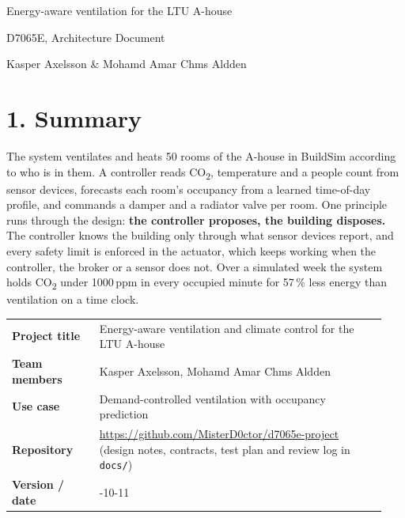 \documentclass[11pt]{article}
\newcommand{\cotwo}{CO\textsubscript{2}}
\begin{document}
\begin{center}
{\LARGE Energy-aware ventilation for the LTU A-house\par}
\vspace{0.4em}
{\large D7065E, Architecture Document\par}
\vspace{0.6em}
{Kasper Axelsson \& Mohamd Amar Chms Aldden\par}
\end{center}

{\hypersetup{linkcolor=black}\setcounter{tocdepth}{1}\small\tableofcontents}

\section{1. Summary}

The system ventilates and heats 50 rooms of the A-house in BuildSim according to who is in
them. A controller reads \cotwo, temperature and a people count from sensor devices,
forecasts each room's occupancy from a learned time-of-day profile, and commands a damper
and a radiator valve per room. One principle runs through the design: \textbf{the
controller proposes, the building disposes.} The controller knows the building only
through what sensor devices report, and every safety limit is enforced in the actuator,
which keeps working when the controller, the broker or a sensor does not. Over a
simulated week the system holds \cotwo{} under 1000\,ppm in every occupied minute for
57\,\% less energy than ventilation on a time clock.

\begin{longtable}[]{@{}>{\raggedright\arraybackslash}p{0.22\linewidth}>{\raggedright\arraybackslash}p{0.72\linewidth}@{}}
\toprule
\textbf{Project title} & Energy-aware ventilation and climate control for the LTU A-house \\
\textbf{Team members} & Kasper Axelsson, Mohamd Amar Chms Aldden \\
\textbf{Use case} & Demand-controlled ventilation with occupancy prediction \\
\textbf{Repository} & \url{https://github.com/MisterD0ctor/d7065e-project} (design notes, contracts, test plan and review log in \texttt{docs/}) \\
\textbf{Version / date} & 2026-10-11 \\
\bottomrule
\end{longtable}
\end{document}
